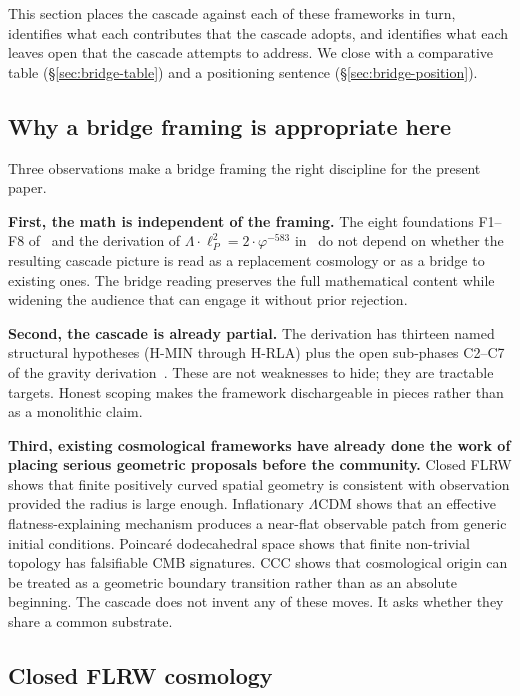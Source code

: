 \documentclass[11pt]{article}
\theoremstyle{plain}
\theoremstyle{definition}
\theoremstyle{remark}
\begin{document}
This section places the cascade against each of these frameworks in turn, identifies what each contributes that the cascade adopts, and identifies what each leaves open that the cascade attempts to address. We close with a comparative table (\S\ref{sec:bridge-table}) and a positioning sentence (\S\ref{sec:bridge-position}).

\subsection{Why a bridge framing is appropriate here}\label{sec:bridge-why}

Three observations make a bridge framing the right discipline for the present paper.

\textbf{First, the math is independent of the framing.} The eight foundations F1--F8 of~\citet{SmartXXXVI} and the derivation of $\Lambda \cdot \ell_P^2 = 2 \cdot \varphi^{-583}$ in~\citet{cascadeLambda} do not depend on whether the resulting cascade picture is read as a replacement cosmology or as a bridge to existing ones. The bridge reading preserves the full mathematical content while widening the audience that can engage it without prior rejection.

\textbf{Second, the cascade is already partial.} The derivation has thirteen named structural hypotheses (H-MIN through H-RLA) plus the open sub-phases C2--C7 of the gravity derivation~\citep{cascadeGR}. These are not weaknesses to hide; they are tractable targets. Honest scoping makes the framework dischargeable in pieces rather than as a monolithic claim.

\textbf{Third, existing cosmological frameworks have already done the work of placing serious geometric proposals before the community.} Closed FLRW shows that finite positively curved spatial geometry is consistent with observation provided the radius is large enough. Inflationary $\Lambda$CDM shows that an effective flatness-explaining mechanism produces a near-flat observable patch from generic initial conditions. Poincar\'e dodecahedral space shows that finite non-trivial topology has falsifiable CMB signatures. CCC shows that cosmological origin can be treated as a geometric boundary transition rather than as an absolute beginning. The cascade does not invent any of these moves. It asks whether they share a common substrate.

\subsection{Closed FLRW cosmology}\label{sec:bridge-flrw}
\end{document}
